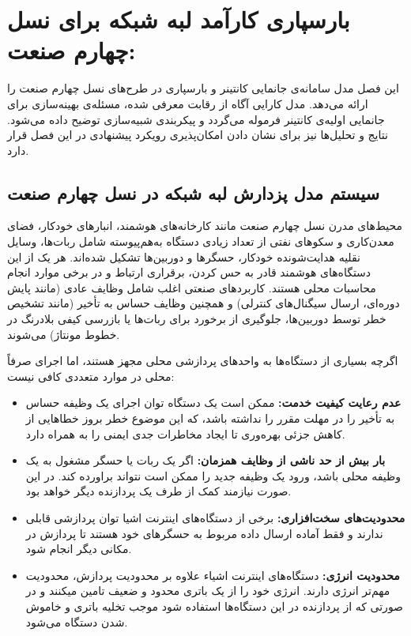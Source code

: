 
\chapter{بارسپاری کارآمد لبه شبکه برای نسل چهارم صنعت:}\label{chap:model}

این فصل مدل سامانه‌ی جانمایی کانتینر و بارسپاری در طرح‌های  نسل چهارم صنعت را ارائه می‌دهد. مدل کارایی آگاه از رقابت معرفی شده، مسئله‌ی بهینه‌سازی برای جانمایی اولیه‌ی کانتینر فرموله می‌گردد و پیکربندی شبیه‌سازی توضیح داده می‌شود. نتایج و تحلیل‌ها نیز برای نشان دادن امکان‌پذیری رویکرد پیشنهادی در این فصل قرار دارد.

\section{سیستم مدل پزدارش لبه شبکه در نسل چهارم صنعت}

محیط‌های مدرن نسل چهارم صنعت مانند کارخانه‌های هوشمند، انبارهای خودکار، فضای معدن‌کاری و سکوهای نفتی از تعداد زیادی دستگاه به‌هم‌پیوسته شامل ربات‌ها، وسایل نقلیه هدایت‌شونده خودکار، حسگرها و دوربین‌ها تشکیل شده‌اند. هر یک از این دستگاه‌های هوشمند قادر به حس کردن، برقراری ارتباط و در برخی موارد انجام محاسبات محلی هستند. کاربردهای صنعتی اغلب شامل وظایف عادی (مانند پایش دوره‌ای، ارسال سیگنال‌های کنترلی) و همچنین وظایف حساس به تأخیر (مانند تشخیص خطر توسط دوربین‌ها، جلوگیری از برخورد برای ربات‌ها یا بازرسی کیفی بلادرنگ در خطوط مونتاژ) می‌شوند.

اگرچه بسیاری از دستگاه‌ها به واحدهای پردازشی محلی مجهز هستند، اما اجرای صرفاً محلی در موارد متعددی کافی نیست:

\begin{itemize}
\item
\textbf{عدم رعایت کیفیت خدمت:} ممکن است یک دستگاه توان اجرای یک وظیفه حساس به تأخیر را در مهلت مقرر را نداشته باشد، که این موضوع خطر بروز خطاهایی از کاهش جزئی بهره‌وری تا ایجاد مخاطرات جدی ایمنی را به همراه دارد.
\item
\textbf{بار بیش از حد ناشی از وظایف همزمان:} اگر یک ربات یا حسگر مشغول به یک وظیفه محلی باشد، ورود یک وظیفه جدید را ممکن است نتواند براورده کند. در این صورت نیازمند کمک از طرف یک پردازنده دیگر خواهد بود.
\item
\textbf{محدودیت‌های سخت‌افزاری:} برخی از دستگاه‌های اینترنت اشیا توان پردازشی قابلی ندارند و فقط آماده ارسال داده مربوط به حسگرهای خود هستند تا پردازش در مکانی دیگر انجام شود.
\item
\textbf{محدودیت انرژی:} دستگاه‌های اینترنت اشیاء علاوه بر محدودیت پردازش، محدودیت مهم‌تر انرژی دارند. انرژی خود را از یک باتری محدود و ضعیف تامین میکنند و در صورتی که از پردازنده در این دستگاه‌ها استفاده شود موجب تخلیه باتری و خاموش شدن دستگاه می‌شود.
\end{itemize}

